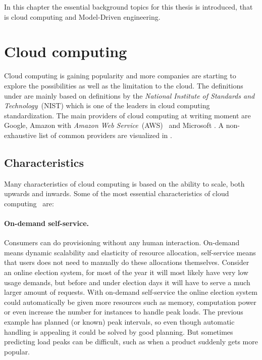 

In this chapter the essential background topics for this thesis is introduced,
that is cloud computing and Model-Driven engineering.

\section{Cloud computing}

Cloud computing is gaining popularity and more companies are starting 
to explore the possibilities as well as the limitation to the cloud.
The definitions under are mainly based on definitions by 
the \emph{National Institute of Standards and Technology}~(NIST) which is one of 
the leaders in cloud computing standardization.
The main providers of cloud computing at writing moment 
are Google, Amazon with \emph{Amazon Web Service}~(AWS)~\cite{aws} and Microsoft .
A non-exhaustive list of common providers are visualized in .

\subsection{Characteristics}

Many characteristics of cloud computing is based on the ability to scale, both upwards and inwards.
Some of the most essential characteristics of cloud computing~\cite{nist:mell11} are:

\paragraph{On-demand self-service.} 

Consumers can do provisioning without any human interaction.
On-demand means dynamic scalability and elasticity of resource allocation,
self-service means that users does not need to manually do these allocations themselves.
Consider an online election system, for most of the year it will most likely have very
low usage demands, but before and under election days it will have to serve
a much larger amount of requests. With on-demand self-service the online election system
could automatically be given more resources such as memory, computation power or even
increase the number for instances to handle peak loads.
The previous example has planned (or known) peak intervals, so even though automatic handling
is appealing it could be solved by good planning. 
But sometimes predicting load peaks can be difficult, such as when a product suddenly
gets more popular.

